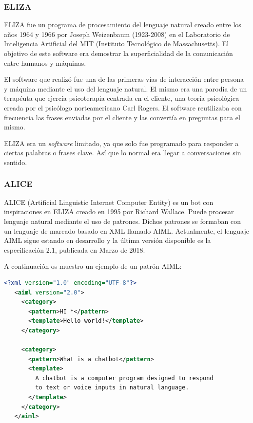 \documentclass[spanish,12pt, a4paper, twoside]{paper}
\begin{document}
\subsubsection{ELIZA}
ELIZA fue un programa de procesamiento del lenguaje natural creado entre los años 1964 y 1966 por Joseph Weizenbaum (1923-2008) en el Laboratorio de Inteligencia Artificial del MIT (Instituto Tecnológico de Massachusetts). El objetivo de este software era demostrar la superficialidad de la comunicación entre humanos y máquinas.
\newline

El software que realizó fue una de las primeras vías de interacción entre persona y máquina mediante el uso del lenguaje natural. El mismo era una parodia de un terapéuta que ejercía psicoterapia centrada en el cliente, una teoría psicológica creada por el psicólogo norteamericano Carl Rogers. El software reutilizaba con frecuencia las frases enviadas por el cliente y las convertía en preguntas para el mismo.
\newline

ELIZA era un \emph{software} limitado, ya que solo fue programado para responder a ciertas palabras o frases clave. Así que lo normal era llegar a conversaciones sin sentido.

\subsubsection{ALICE}
ALICE (Artificial Linguistic Internet Computer Entity) es un bot con inspiraciones en ELIZA creado en 1995 por Richard Wallace. Puede procesar lenguaje natural mediante el uso de patrones. Dichos patrones se formaban con un lenguaje de marcado basado en XML llamado AIML. Actualmente, el lenguaje AIML sigue estando en desarrollo y la última versión disponible es la especificación 2.1, publicada en Marzo de 2018. 
\newline

A continuación os muestro un ejemplo de un patrón AIML:
\begin{lstlisting}[language=xml]
<?xml version="1.0" encoding="UTF-8"?>
   <aiml version="2.0">
     <category>
       <pattern>HI *</pattern>
       <template>Hello world!</template>
     </category>

     <category>
       <pattern>What is a chatbot</pattern>
       <template>
         A chatbot is a computer program designed to respond
         to text or voice inputs in natural language.
       </template>
     </category>
   </aiml>
\end{lstlisting}
\end{document}
